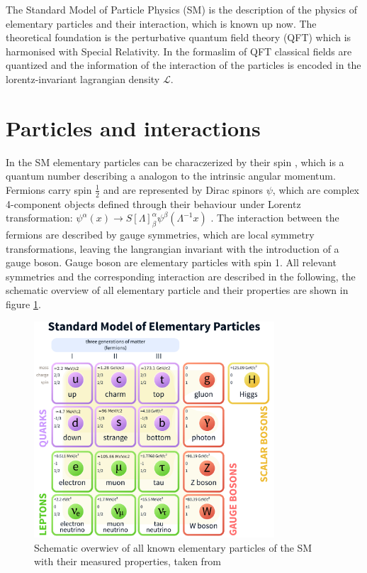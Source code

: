 The Standard Model of Particle Physics (\gls{SM}) \cite{SM} is the description of the physics of elementary particles and their interaction, which is known up now. The theoretical foundation is the perturbative quantum field theory (\gls{QFT}) which is harmonised with Special Relativity. In the formaslim of \gls{QFT} classical fields are quantized and the information of the interaction of the particles is encoded in the lorentz-invariant lagrangian density $\mathcal{L}$. 



\section{Particles and interactions}
\label{sec:section_1_1}

In the \gls{SM} elementary particles can be characzerized by their spin \cite{SPIN}, which is a quantum number describing a analogon to the intrinsic angular momentum. Fermions carry spin $\frac{1}{2}$ and are represented by Dirac spinors $\psi$, which are complex 4-component objects defined through their behaviour under Lorentz transformation: $\psi^{\alpha}(x) \rightarrow S[\Lambda]^{\alpha}_{\beta} \psi^{\beta}(\Lambda^{-1}x)$ \cite{spinor}. The interaction between the fermions are described by gauge symmetries, which are local symmetry transformations, leaving the langrangian invariant with the introduction of a gauge boson. Gauge boson are elementary particles with spin 1. All relevant symmetries and the corresponding interaction are described in the following, the schematic overview of all elementary particle and their properties are shown in figure \ref{fig:fig_1_1}.


\begin{figure}[ht]
	\centering
	\includegraphics[width=0.8\textwidth]{pictures/Standard_Model_of_Elementary_Particles.pdf}

	\caption[Schematic overwiev of Standard Model particles]{Schematic overwiev of all known elementary particles of the \gls{SM} with their measured properties, taken from \cite{SMPARTICLES}}
	\label{fig:fig_1_1}
\end{figure}


